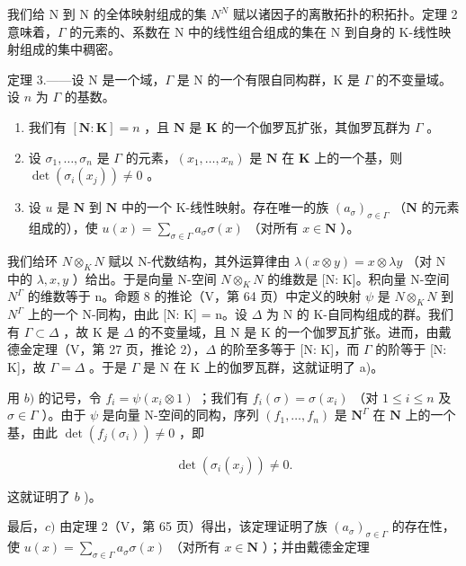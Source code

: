 我们给 N 到 N 的全体映射组成的集 \(N^{N}\) 赋以诸因子的离散拓扑的积拓扑。定理 2 意味着，\(\Gamma\) 的元素的、系数在 N 中的线性组合组成的集在 N 到自身的 K-线性映射组成的集中稠密。

定理 3.——设 N 是一个域，\(\Gamma\) 是 N 的一个有限自同构群，K 是 \(\Gamma\) 的不变量域。设 \(n\) 为 \(\Gamma\) 的基数。

\begin{enumerate}
\def\labelenumi{\alph{enumi})}
\item
  我们有 \([\mathbf{N}:\mathbf{K}] = n\) ，且 \(\mathbf{N}\) 是 \(\mathbf{K}\) 的一个伽罗瓦扩张，其伽罗瓦群为 \(\Gamma\) 。
\item
  设 \(\sigma_1, \ldots, \sigma_n\) 是 \(\Gamma\) 的元素，\((x_1, \ldots, x_n)\) 是 \(\mathbf{N}\) 在 \(\mathbf{K}\) 上的一个基，则 \(\det (\sigma_i(x_j)) \neq 0\) 。
\item
  设 \(u\) 是 \(\mathbf{N}\) 到 \(\mathbf{N}\) 中的一个 K-线性映射。存在唯一的族 \((a_{\sigma})_{\sigma \in \Gamma}\) （\(\mathbf{N}\) 的元素组成的），使 \(u(x) = \sum_{\sigma \in \Gamma} a_{\sigma} \sigma(x)\) （对所有 \(x \in \mathbf{N}\) ）。
\end{enumerate}

我们给环 \(N \otimes_{K} N\) 赋以 N-代数结构，其外运算律由 \(\lambda(x \otimes y) = x \otimes \lambda y\) （对 N 中的 \(\lambda, x, y\) ）给出。于是向量 N-空间 \(N \otimes_{K} N\) 的维数是 {[}N: K{]}。积向量 N-空间 \(N^{\Gamma}\) 的维数等于 n。命题 8 的推论（V，第 64 页）中定义的映射 \(\psi\) 是 \(N \otimes_{K} N\) 到 \(N^{\Gamma}\) 上的一个 N-同构，由此 {[}N: K{]} = n。设 \(\Delta\) 为 N 的 K-自同构组成的群。我们有 \(\Gamma \subset \Delta\) ，故 K 是 \(\Delta\) 的不变量域，且 N 是 K 的一个伽罗瓦扩张。进而，由戴德金定理（V，第 27 页，推论 2），\(\Delta\) 的阶至多等于 {[}N: K{]}，而 \(\Gamma\) 的阶等于 {[}N: K{]}，故 \(\Gamma = \Delta\) 。于是 \(\Gamma\) 是 N 在 K 上的伽罗瓦群，这就证明了 a)。

用 \(b)\) 的记号，令 \(f_{i} = \psi(x_{i} \otimes 1)\) ；我们有 \(f_{i}(\sigma) = \sigma(x_{i})\) （对 \(1 \leqslant i \leqslant n\) 及 \(\sigma \in \Gamma\) ）。由于 \(\psi\) 是向量 N-空间的同构，序列 \((f_{1}, \ldots, f_{n})\) 是 \(\mathbf{N}^{\Gamma}\) 在 \(\mathbf{N}\) 上的一个基，由此 \(\det(f_{j}(\sigma_{i})) \neq 0\) ，即

\[
\det \left(\sigma_ {i} (x _ {j})\right) \neq 0.
\]

这就证明了 \(b\) )。

最后，\(c)\) 由定理 2（V，第 65 页）得出，该定理证明了族 \((a_{\sigma})_{\sigma \in \Gamma}\) 的存在性，使 \(u(x) = \sum_{\sigma \in \Gamma} a_{\sigma} \sigma(x)\) （对所有 \(x \in \mathbf{N}\) ）；并由戴德金定理

